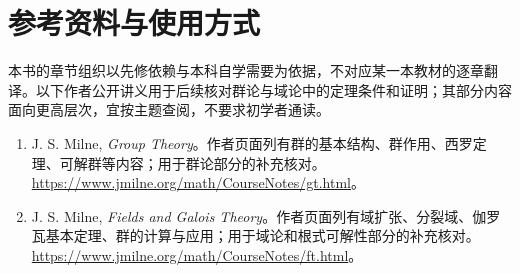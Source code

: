 \chapter{参考资料与使用方式}

本书的章节组织以先修依赖与本科自学需要为依据，不对应某一本教材的逐章翻译。以下作者公开讲义用于后续核对群论与域论中的定理条件和证明；其部分内容面向更高层次，宜按主题查阅，不要求初学者通读。

\begin{enumerate}
  \item J. S. Milne, \textit{Group Theory}。作者页面列有群的基本结构、群作用、西罗定理、可解群等内容；用于群论部分的补充核对。\url{https://www.jmilne.org/math/CourseNotes/gt.html}。
  \item J. S. Milne, \textit{Fields and Galois Theory}。作者页面列有域扩张、分裂域、伽罗瓦基本定理、群的计算与应用；用于域论和根式可解性部分的补充核对。\url{https://www.jmilne.org/math/CourseNotes/ft.html}。
\end{enumerate}

